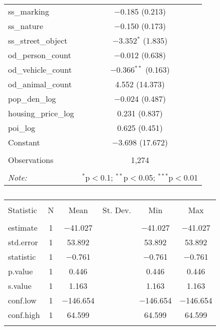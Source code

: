 \begin{table}[!htbp]
\begin{tabular}{@{\extracolsep{1pt}}lc}
  ss\_marking & $-$0.185 (0.213) \\ 
  ss\_nature & $-$0.150 (0.173) \\ 
  ss\_street\_object & $-$3.352$^{*}$ (1.835) \\ 
  od\_person\_count & $-$0.012 (0.638) \\ 
  od\_vehicle\_count & $-$0.366$^{**}$ (0.163) \\ 
  od\_animal\_count & 4.552 (14.373) \\ 
  pop\_den\_log & $-$0.024 (0.487) \\ 
  housing\_price\_log & 0.231 (0.837) \\ 
  poi\_log & 0.625 (0.451) \\ 
  Constant & $-$3.698 (17.672) \\ 
 \hline \\[-1.8ex] 
Observations & 1,274 \\ 
\hline 
\hline \\[-1.8ex] 
\textit{Note:}  & \multicolumn{1}{r}{$^{*}$p$<$0.1; $^{**}$p$<$0.05; $^{***}$p$<$0.01} \\ 
\end{tabular} 
\end{table} 

\begin{table}[!htbp] \centering 
  \caption{} 
  \label{} 
\small 
\begin{tabular}{@{\extracolsep{1pt}}lccccc} 
\\[-1.8ex]\hline 
\hline \\[-1.8ex] 
Statistic & \multicolumn{1}{c}{N} & \multicolumn{1}{c}{Mean} & \multicolumn{1}{c}{St. Dev.} & \multicolumn{1}{c}{Min} & \multicolumn{1}{c}{Max} \\ 
\hline \\[-1.8ex] 
estimate & 1 & $-$41.027 &  & $-$41.027 & $-$41.027 \\ 
std.error & 1 & 53.892 &  & 53.892 & 53.892 \\ 
statistic & 1 & $-$0.761 &  & $-$0.761 & $-$0.761 \\ 
p.value & 1 & 0.446 &  & 0.446 & 0.446 \\ 
s.value & 1 & 1.163 &  & 1.163 & 1.163 \\ 
conf.low & 1 & $-$146.654 &  & $-$146.654 & $-$146.654 \\ 
conf.high & 1 & 64.599 &  & 64.599 & 64.599 \\ 
\hline \\[-1.8ex] 
\end{tabular} 
\end{table} 

